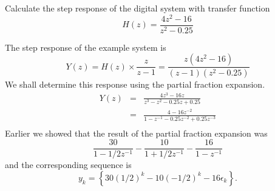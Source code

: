 \ifslidesonly
\begin{slide}\label{slide:l9s8} 

\end{slide}
\fi


\ifslidesonly
\begin{slide}\label{slide:l9s9} 

\end{slide}
\fi


\ifslidesonly
\begin{slide}\label{slide:l9s10} 
Calculate the step response of the digital system with transfer function
  \[ H(z) = \frac{4z^2 - 16}{z^2 - 0.25}\]
\end{slide}
\fi

The step response of the example system is
\[ Y(z) = H(z)\times \frac{z}{z-1} = \frac{z(4z^2 - 16)}{(z-1)(z^2 - 0.25)}\]
We shall determine this response using the partial fraction
expansion.
\begin{eqnarray*}
Y(z) &=& \frac{4z^3 - 16z}{z^3 - z^2 - 0.25z + 0.25}\\
 &=& \frac{4 - 16z^{-2}}{1 - z^{-1} - 0.25z^{-2} + 0.25z^{-3}}\\
\end{eqnarray*}
Earlier we showed that the result of the partial
fraction expansion was
\[\frac{30}{1-1/2 z^{-1}} - \frac{10}{1+1/2z^{-1}} -
\frac{16}{1-z^{-1}}\] and the corresponding sequence is
\[y_k = \left\{30(1/2)^k -10(-1/2)^k -16\epsilon_k\right\}.\]


\endinput

